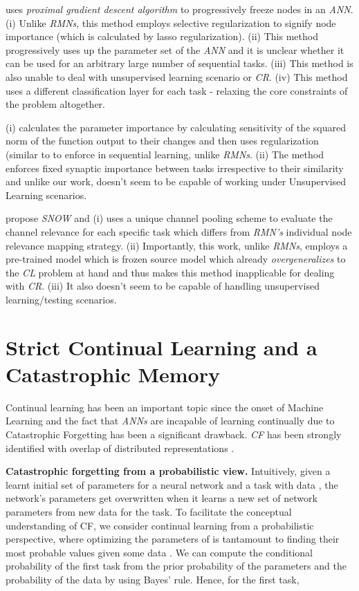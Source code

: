 \documentclass{article}
\begin{document}
\cite{jung2020continual} uses \textit{proximal gradient descent algorithm} to progressively freeze nodes in an \textit{ANN}. 
(i) Unlike \textit{RMNs}, this method employs selective regularization to signify node importance (which is calculated by lasso regularization). 
(ii) This method progressively uses up the parameter set of the \textit{ANN} and it is unclear whether it can be used for an arbitrary large number of sequential tasks. 
(iii) This method is also unable to deal with unsupervised learning scenario or \textit{CR}. (iv) This method uses a different classification layer for each task - relaxing the core constraints of the problem altogether.

\cite{ferrari_memory_2018} (i) calculates the parameter importance by calculating sensitivity of the squared  norm of the function output to their changes and then uses regularization (similar to \cite{kirkpatrick2017overcoming} to enforce in sequential learning, unlike \textit{RMNs}. 
    (ii) The method enforces fixed synaptic importance between tasks irrespective to their similarity and unlike our work, doesn't seem to be capable of working under Unsupervised Learning scenarios.
    
\cite{yoo_snow_2020} propose \textit{SNOW} and (i) uses a unique channel pooling scheme to evaluate the channel relevance for each specific task which differs from \textit{RMN's} individual node relevance mapping strategy. 
    (ii) Importantly, this work, unlike \textit{RMNs}, employs a pre-trained model which is frozen source model which already \textit{overgeneralizes} to the \textit{CL} problem at hand and thus makes this method inapplicable for dealing with \textit{CR}. (iii) It also doesn't seem to be capable of handling unsupervised learning/testing scenarios.

\label{related}


\section{Strict Continual Learning and a Catastrophic Memory}\label{disc}
Continual learning has been an important topic since the onset of Machine Learning and the fact that \textit{ANNs} are incapable of learning continually due to Catastrophic Forgetting has been a significant drawback. 
\textit{CF} has been strongly identified with overlap of distributed representations \cite{French1991}.

\textbf{Catastrophic forgetting from a probabilistic view.}
Intuitively, given a learnt initial set of parameters  for a neural network  and a task  with data , the network's parameters get overwritten
when it learns a new set of network parameters  from new data  for the  task. 
To facilitate the conceptual understanding of CF, we consider continual learning from a probabilistic perspective, where  optimizing the parameters  of  is tantamount to finding their most probable values given some data   \cite{kirkpatrick2017overcoming}. 
We can compute the conditional probability of the first task  from the prior probability of the parameters  and the probability of the data  by using Bayes’ rule. Hence, for the first task,
\end{document}
